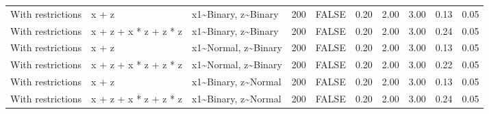 \begin{longtable}{lllrlrrrrr}
  With restrictions & x + z & x1\~{}Binary, z\~{}Binary & 200 & FALSE & 0.20 & 2.00 & 3.00 & 0.13 & 0.05 \\ 
  With restrictions & x + z + x * z + z * z & x1\~{}Binary, z\~{}Binary & 200 & FALSE & 0.20 & 2.00 & 3.00 & 0.24 & 0.05 \\ 
  With restrictions & x + z & x1\~{}Normal, z\~{}Binary & 200 & FALSE & 0.20 & 2.00 & 3.00 & 0.13 & 0.05 \\ 
  With restrictions & x + z + x * z + z * z & x1\~{}Normal, z\~{}Binary & 200 & FALSE & 0.20 & 2.00 & 3.00 & 0.22 & 0.05 \\ 
  With restrictions & x + z & x1\~{}Binary, z\~{}Normal & 200 & FALSE & 0.20 & 2.00 & 3.00 & 0.13 & 0.05 \\ 
  With restrictions & x + z + x * z + z * z & x1\~{}Binary, z\~{}Normal & 200 & FALSE & 0.20 & 2.00 & 3.00 & 0.24 & 0.05 \\ 
   \hline
\hline
\end{longtable}
